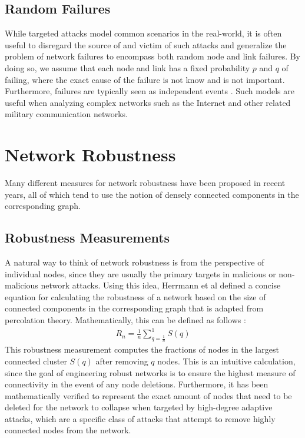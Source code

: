 \documentclass[doc]{apa}%
\begin{document}
\subsection{Random Failures}
\label{RandomFailures}
While targeted attacks model common scenarios in the real-world, it is often useful to disregard the source of and victim of such attacks and generalize the problem of network failures to encompass both random node and link failures. By doing so, we assume that each node and link has a fixed probability $p$ and $q$ of failing, where the exact cause of the failure is not know and is not important. Furthermore, failures are typically seen as independent events \cite{RandomStudy}. Such models are useful when analyzing complex networks such as the Internet and other related military communication networks. 

\section{Network Robustness}

Many different measures for network robustness have been proposed in recent years, all of which tend
to use the notion of densely connected components in the corresponding graph. 


\subsection{Robustness Measurements}

A natural way to think of network robustness is from the perspective of individual nodes, since they are 
usually the primary targets in malicious or non-malicious network attacks. Using this idea, Herrmann et al
defined a concise equation for calculating the robustness of a network based on the size of connected
components in the corresponding graph that is adapted from percolation theory. Mathematically, this can be defined as follows \cite{Onion}:
\begin{eqnarray*}
R_{n} = \frac{1}{n}\sum_{q=\frac{1}{n}}^{1}S(q)
\end{eqnarray*}
This robustness measurement computes the fractions of nodes in the largest connected cluster $S(q)$ after removing $q$ nodes. This is an intuitive calculation, since the goal of engineering robust networks is to ensure the highest measure of connectivity in the event of any node deletions. Furthermore, it has been mathematically verified to represent the exact amount of nodes that need to be deleted for the network to collapse when targeted by high-degree adaptive attacks, which are a specific class of attacks that attempt to remove highly connected nodes from the network. 
\end{document}
